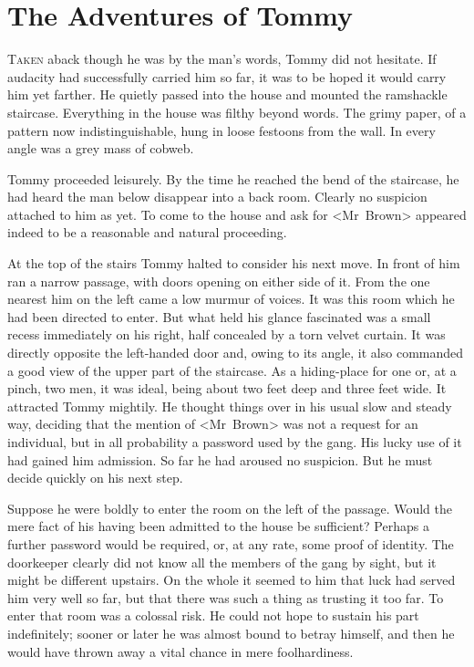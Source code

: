 \chapter{The Adventures of Tommy} 

 \lettrine{T}{aken} aback though he was by the man's words, Tommy did not hesitate. If audacity had successfully carried him so far, it was to be hoped it would carry him yet farther. He quietly passed into the house and mounted the ramshackle staircase. Everything in the house was filthy beyond words. The grimy paper, of a pattern now indistinguishable, hung in loose festoons from the wall. In every angle was a grey mass of cobweb.

Tommy proceeded leisurely. By the time he reached the bend of the staircase, he had heard the man below disappear into a back room. Clearly no suspicion attached to him as yet. To come to the house and ask for <Mr~Brown> appeared indeed to be a reasonable and natural proceeding.

At the top of the stairs Tommy halted to consider his next move. In front of him ran a narrow passage, with doors opening on either side of it. From the one nearest him on the left came a low murmur of voices. It was this room which he had been directed to enter. But what held his glance fascinated was a small recess immediately on his right, half concealed by a torn velvet curtain. It was directly opposite the left-handed door and, owing to its angle, it also commanded a good view of the upper part of the staircase. As a hiding-place for one or, at a pinch, two men, it was ideal, being about two feet deep and three feet wide. It attracted Tommy mightily. He thought things over in his usual slow and steady way, deciding that the mention of <Mr~Brown> was not a request for an individual, but in all probability a password used by the gang. His lucky use of it had gained him admission. So far he had aroused no suspicion. But he must decide quickly on his next step.

Suppose he were boldly to enter the room on the left of the passage. Would the mere fact of his having been admitted to the house be sufficient? Perhaps a further password would be required, or, at any rate, some proof of identity. The doorkeeper clearly did not know all the members of the gang by sight, but it might be different upstairs. On the whole it seemed to him that luck had served him very well so far, but that there was such a thing as trusting it too far. To enter that room was a colossal risk. He could not hope to sustain his part indefinitely; sooner or later he was almost bound to betray himself, and then he would have thrown away a vital chance in mere foolhardiness.

